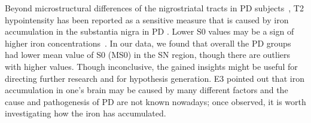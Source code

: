 

Beyond microstructural differences of the nigrostriatal tracts in PD subjects~\cite{zhang2015diffusion}, T2 hypointensity has been reported as a sensitive measure that is caused by iron accumulation in the substantia nigra in PD \cite{ollivier2018neuroimaging}. Lower S0 values may be a sign of higher iron concentrations~\cite{10.1001/archneur.59.1.62}. In our data, we found that overall the PD groups had lower mean value of S0 (MS0) in the SN region, though there are outliers with higher values. Though inconclusive, the gained insights might be useful for directing further research and for hypothesis generation. E3 pointed out that iron accumulation in one's brain may be caused by many different factors and the cause and pathogenesis of PD are not known nowadays; once observed, it is worth investigating how the iron has accumulated.







